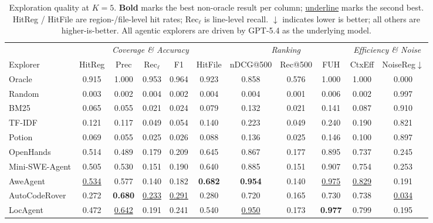 \begin{table}[t]
  \centering
  \caption{Exploration quality at $K{=}5$. \textbf{Bold} marks the best non-oracle result per column; \underline{underline} marks the second best. HitReg / HitFile are region-/file-level hit rates; Rec$_\ell$ is line-level recall. $\downarrow$ indicates lower is better; all others are higher-is-better. All agentic explorers are driven by GPT-5.4 as the underlying model.}
  
  \label{tab:main-results}
  \vspace{1mm}
  \scriptsize
  \renewcommand{\arraystretch}{1.10}
  \setlength{\tabcolsep}{4pt}
  \begin{tabular*}{\textwidth}{@{\extracolsep{\fill}} l ccccc ccc cc @{}}
    \toprule
    & \multicolumn{5}{c}{\textit{Coverage \& Accuracy}} & \multicolumn{3}{c}{\textit{Ranking}} & \multicolumn{2}{c}{\textit{Efficiency \& Noise}} \\
    \cmidrule(lr){2-6} \cmidrule(lr){7-9} \cmidrule(lr){10-11}
    Explorer
      & HitReg & Prec & Rec$_\ell$ & F1 & HitFile
      & nDCG@500 & Rec@500 & FUH
      & CtxEff & NoiseReg$\downarrow$ \\
    \midrule
    Oracle  & 0.915 & 1.000 & 0.953 & 0.964 & 0.923 & 0.858 & 0.576 & 1.000 & 1.000 & 0.000 \\
    Random  & 0.003 & 0.002 & 0.004 & 0.002 & 0.004 & 0.004 & 0.001 & 0.006 & 0.002 & 0.997 \\
    \midrule
    BM25    & 0.065 & 0.055 & 0.021 & 0.024 & 0.079 & 0.132 & 0.021 & 0.141 & 0.087 & 0.910 \\
    TF-IDF  & 0.121 & 0.117 & 0.049 & 0.054 & 0.140 & 0.223 & 0.049 & 0.240 & 0.190 & 0.821 \\
    Potion  & 0.069 & 0.055 & 0.025 & 0.026 & 0.088 & 0.136 & 0.025 & 0.146 & 0.100 & 0.897 \\
    \midrule
    OpenHands      & 0.514 & 0.489 & 0.179 & 0.209 & 0.645 & 0.867 & 0.177 & 0.895 & 0.737 & 0.245 \\
    Mini-SWE-Agent & 0.505 & 0.530 & 0.151 & 0.190 & 0.640 & 0.885 & 0.151 & 0.907 & 0.754 & 0.253 \\
    AweAgent       & \underline{0.534} & 0.577 & 0.140 & 0.182 & \textbf{0.682} & \textbf{0.954} & 0.140 & \underline{0.975} & \underline{0.829} & 0.191 \\
    AutoCodeRover  & 0.272 & \textbf{0.680} & \underline{0.233} & \underline{0.291} & 0.280 & 0.720 & 0.165 & 0.730 & 0.738 & \underline{0.034} \\
    LocAgent       & 0.472 & \underline{0.642} & 0.191 & 0.241 & 0.540 & \underline{0.950} & 0.173 & \textbf{0.977} & 0.799 & 0.195 \\

\end{tabular*}
\end{table}
